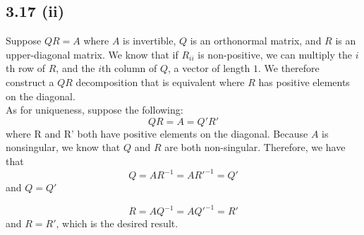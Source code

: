 \documentclass[letterpaper,12pt]{article}
\theoremstyle{definition}
\begin{document}
\subsection*{3.17 (ii)}


Suppose $QR = A$ where $A$ is invertible, $Q$ is an orthonormal matrix, and $R$ is an upper-diagonal matrix. 
We know that if $R_{ii}$ is non-positive, we can multiply the $i$th row of $R$, and the $i$th column of $Q$, a vector of length $1$. We therefore construct a $QR$ decomposition that is equivalent where $R$ has positive elements on the diagonal.\\
As for uniqueness, suppose the following:
\[
    QR = A = Q'R'
\]
where R and R' both have positive elements on the diagonal. Because $A$ is nonsingular, we know that $Q$ and $R$ are both non-singular. Therefore, we have that
\[
    Q = AR^{-1} = AR'^{-1} = Q'
\]
and $Q = Q'$

\[
    R = AQ^{-1} = AQ'^{-1} = R'
\]
and $R = R'$, which is the desired result.
\end{document}
